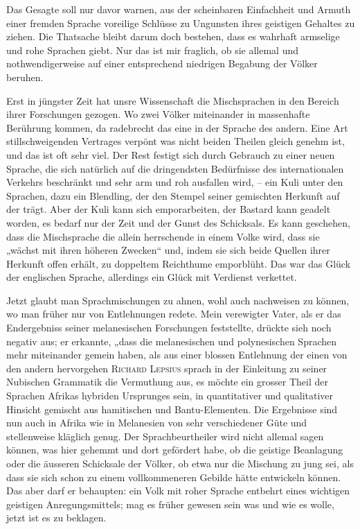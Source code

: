 Das Gesagte soll nur davor warnen, aus der scheinbaren Einfachheit und Armuth einer fremden Sprache voreilige Schlüsse zu Ungunsten ihres geistigen Gehaltes zu ziehen. Die Thatsache bleibt darum doch bestehen, dass es wahrhaft armselige und rohe Sprachen giebt. Nur das ist mir fraglich, ob sie allemal und nothwendigerweise auf einer entsprechend niedrigen Begabung der Völker beruhen.

Erst in jüngster Zeit hat unsre Wissenschaft die Mischsprachen in den Bereich ihrer Forschungen gezogen. Wo zwei Völker miteinander in massenhafte Berührung kommen, da radebrecht das eine in der Sprache des andern. Eine Art stillschweigenden Vertrages verpönt  was nicht beiden Theilen gleich genehm ist, und das ist oft sehr viel. Der Rest festigt sich durch Gebrauch zu einer neuen Sprache, die sich natür\label{fp.387}lich auf die dringendsten Bedürfnisse des internationalen Verkehrs beschränkt und sehr arm und roh ausfallen wird, – ein Kuli unter den Sprachen, dazu ein Blendling, der den Stempel seiner gemischten Herkunft auf der  trägt. Aber der Kuli kann sich emporarbeiten, der Bastard kann geadelt worden, es bedarf nur der Zeit und der Gunst des Schicksals. Es kann geschehen, dass die Mischsprache die allein herrschende in einem Volke wird, dass sie „wächst mit ihren höheren Zwecken“ und, indem sie sich beide Quellen ihrer Herkunft offen erhält, zu doppeltem Reichthume emporblüht. Das war das Glück der englischen Sprache, allerdings ein Glück mit Verdienst verkettet.

\largerpage[1]Jetzt glaubt man Sprachmischungen zu ahnen, wohl auch nachweisen zu können, wo man früher nur von Entlehnungen redete. Mein verewigter Vater, als er das Endergebniss seiner melanesischen Forschungen feststellte, drückte sieh noch negativ aus; er erkannte, „dass die melanesischen und polynesischen Sprachen mehr miteinander gemein haben, als aus einer blossen Entlehnung der einen von den andern hervorgehen  \textsc{Richard Lepsius} sprach in der Einleitung zu seiner Nubischen Grammatik die Vermuthung aus, es möchte ein grosser Theil der Sprachen Afrikas hybriden Ursprunges sein, in quantitativer und qualitativer Hinsicht  gemischt aus hamitischen und Bantu-Elementen. Die Ergebnisse sind nun auch in Afrika wie in Melanesien von sehr verschiedener Güte und stellenweise kläglich genug. Der Sprachbeurtheiler wird nicht allemal sagen können, was hier gehemmt und dort gefördert habe, ob die geistige Beanlagung oder die äusseren Schicksale der Völker, ob etwa nur die Mischung zu jung sei, als dass sie sich schon zu einem vollkommeneren Gebilde hätte entwickeln \label{sp.407} können. Das aber darf er behaupten: ein Volk mit roher Sprache entbehrt eines wichtigen geistigen Anregungsmittels; mag es früher gewesen sein was und wie es wolle, jetzt ist es zu beklagen.

